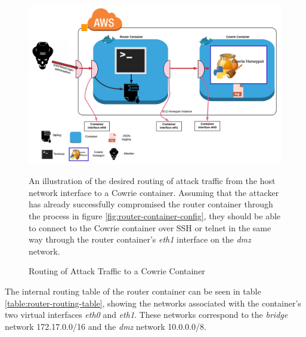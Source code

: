 \begin{figure}[ht]
      \centering
      \includegraphics[width=160mm, scale=1]{Images/Cowrie_container_config.png}
      \caption{Routing of Attack Traffic to a Cowrie Container} 
      \medskip
      \small
		An illustration of the desired routing of attack traffic from the host network interface to a Cowrie container. Assuming that the attacker has already successfully compromised the router container through the process in figure \ref{fig:router-container-config},  they should be able to connect to the Cowrie container over SSH or telnet in the same way through the router container's \textit{eth1} interface on the \textit{dmz} network. 
\label{fig:cowrie-honeynet-container-config}
\end{figure}


The internal routing table of the router container can be seen in table \ref{table:router-routing-table}, showing the networks associated with the container's two virtual interfaces \textit{eth0} and \textit{eth1}. These networks correspond to the \textit{bridge} network 172.17.0.0/16 and the \textit{dmz} network 10.0.0.0/8.


